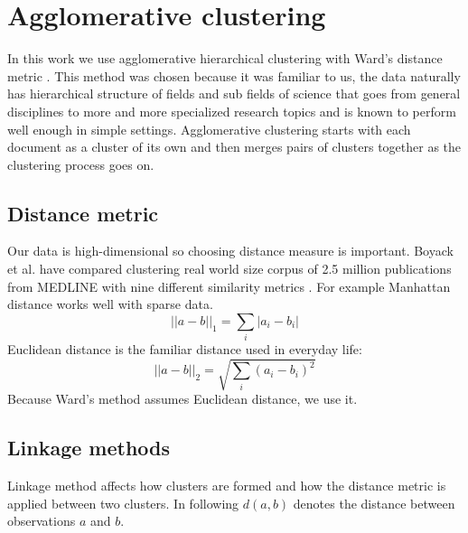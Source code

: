 \section{Agglomerative clustering}
\label{sec:agglomerativeclustering}
In this work we use agglomerative hierarchical clustering with 
Ward's distance metric \cite{ward_jr_hierarchical_1963}. This 
method was chosen because it was familiar to us, the data naturally 
has hierarchical structure of fields and sub fields of science that 
goes from general disciplines to more and more specialized research
topics and is known to perform well enough in simple settings. 
Agglomerative clustering starts with each document 
as a cluster of its own and then merges pairs of clusters together 
as the clustering process goes on.


\subsection{Distance metric}
Our data is high-dimensional so choosing distance measure is 
important. 
Boyack et al. have compared clustering real world size corpus of 
2.5 million publications from MEDLINE with nine different 
similarity metrics \cite{boyack_clustering_2011}.
For example Manhattan distance works well with sparse data.
\begin{equation}
 ||a-b||_1 = \sum_i{|a_i-b_i|}
\end{equation}
Euclidean distance is the familiar distance used in everyday life:
\begin{equation}
 ||a-b||_2 = \sqrt{\sum_i{(a_i-b_i)^2}}
\end{equation}
Because Ward's method assumes Euclidean distance, we use it.



\subsection{Linkage methods}

Linkage method affects how clusters are formed and how the 
distance metric is applied between two clusters. In following 
$d(a,b)$ denotes the distance between observations $a$ and $b$.

